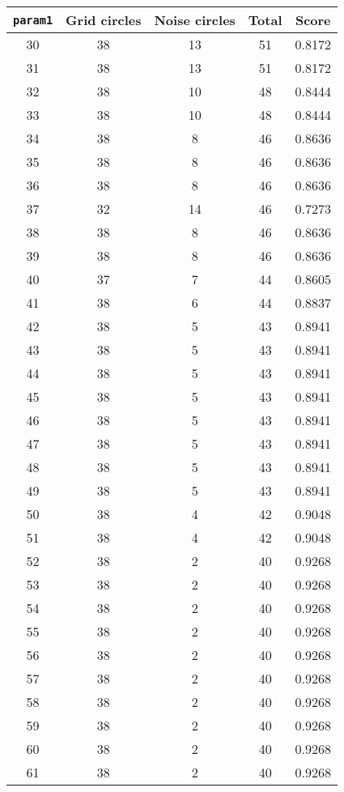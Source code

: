 \documentclass[letterpaper, 12pt]{article}
\begin{document}
\begin{longtable}{|c|c|c|c|c|}
\hline
\textbf{\texttt{param1}} & \textbf{Grid circles} & \textbf{Noise circles} & \textbf{Total} & \textbf{Score} \\
\hline
30 & 38 & 13 & 51 & 0.8172 \\
\hline
31 & 38 & 13 & 51 & 0.8172 \\
\hline
32 & 38 & 10 & 48 & 0.8444 \\
\hline
33 & 38 & 10 & 48 & 0.8444 \\
\hline
34 & 38 & 8 & 46 & 0.8636 \\
\hline
35 & 38 & 8 & 46 & 0.8636 \\
\hline
36 & 38 & 8 & 46 & 0.8636 \\
\hline
37 & 32 & 14 & 46 & 0.7273 \\
\hline
38 & 38 & 8 & 46 & 0.8636 \\
\hline
39 & 38 & 8 & 46 & 0.8636 \\
\hline
40 & 37 & 7 & 44 & 0.8605 \\
\hline
41 & 38 & 6 & 44 & 0.8837 \\
\hline
42 & 38 & 5 & 43 & 0.8941 \\
\hline
43 & 38 & 5 & 43 & 0.8941 \\
\hline
44 & 38 & 5 & 43 & 0.8941 \\
\hline
45 & 38 & 5 & 43 & 0.8941 \\
\hline
46 & 38 & 5 & 43 & 0.8941 \\
\hline
47 & 38 & 5 & 43 & 0.8941 \\
\hline
48 & 38 & 5 & 43 & 0.8941 \\
\hline
49 & 38 & 5 & 43 & 0.8941 \\
\hline
50 & 38 & 4 & 42 & 0.9048 \\
\hline
51 & 38 & 4 & 42 & 0.9048 \\
\hline
52 & 38 & 2 & 40 & 0.9268 \\
\hline
53 & 38 & 2 & 40 & 0.9268 \\
\hline
54 & 38 & 2 & 40 & 0.9268 \\
\hline
55 & 38 & 2 & 40 & 0.9268 \\
\hline
56 & 38 & 2 & 40 & 0.9268 \\
\hline
57 & 38 & 2 & 40 & 0.9268 \\
\hline
58 & 38 & 2 & 40 & 0.9268 \\
\hline
59 & 38 & 2 & 40 & 0.9268 \\
\hline
60 & 38 & 2 & 40 & 0.9268 \\
\hline
61 & 38 & 2 & 40 & 0.9268 \\

\end{longtable}
\end{document}
